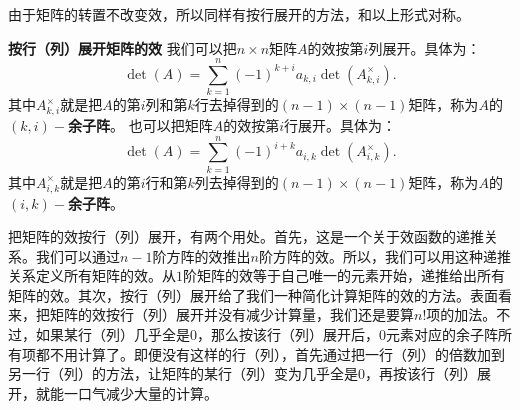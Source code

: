 \documentclass[12pt,UTF8,fontset=none]{ctexbook}
\begin{document}
由于矩阵的转置不改变效，所以同样有按行展开的方法，和以上形式对称。

\begin{tm}{\textbf{按行（列）展开矩阵的效}}
    我们可以把$n\times n$矩阵$A$的效按第$i$列展开。具体为：
    $$
    \det(A) = \sum_{k=1}^n (-1)^{k+i} a_{k,i} \det(A_{k,i}^{\times}).
    $$
    其中$A_{k,i}^{\times}$就是把$A$的第$i$列和第$k$行去掉得到的$(n-1)\times (n-1)$矩阵，称为$A$的$(k,i)-$\textbf{余子阵}。
    也可以把矩阵$A$的效按第$i$行展开。具体为：
    $$
    \det(A) = \sum_{k=1}^n (-1)^{i+k} a_{i,k} \det(A_{i,k}^{\times}).
    $$
    其中$A_{i,k}^{\times}$就是把$A$的第$i$行和第$k$列去掉得到的$(n-1)\times (n-1)$矩阵，称为$A$的$(i,k)-$\textbf{余子阵}。
\end{tm}

把矩阵的效按行（列）展开，有两个用处。首先，这是一个关于效函数的递推关系。我们可以通过$n-1$阶方阵的效推出$n$阶方阵的效。所以，我们可以用这种递推关系定义所有矩阵的效。从$1$阶矩阵的效等于自己唯一的元素开始，递推给出所有矩阵的效。其次，按行（列）展开给了我们一种简化计算矩阵的效的方法。表面看来，把矩阵的效按行（列）展开并没有减少计算量，我们还是要算$n!$项的加法。不过，如果某行（列）几乎全是$0$，那么按该行（列）展开后，$0$元素对应的余子阵所有项都不用计算了。即便没有这样的行（列），首先通过把一行（列）的倍数加到另一行（列）的方法，让矩阵的某行（列）变为几乎全是$0$，再按该行（列）展开，就能一口气减少大量的计算。
\end{document}
